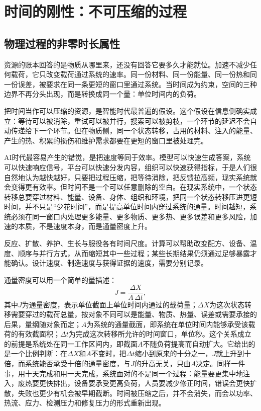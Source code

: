 \section{时间的刚性：不可压缩的过程}

\subsection{物理过程的非零时长属性}

资源的账本回答的是物质从哪里来，还没有回答它要多久才能就位。加速不减少任何载荷，它只改变载荷通过系统的速率。同一份材料、同一份能量、同一份热和同一份误差，被要求在同一条更短的窗口里通过系统。当时间成为约束，空间的三种边界不再分头出现，而是转换成同一个量：单位时间内的负荷。

把时间当作可以压缩的资源，是智能时代最普遍的假设。这个假设在信息侧确实成立：等待可以被消除，重试可以被并行，搜索可以被剪枝，一个环节的延迟不会自动传递给下一个环节。但在物质侧，同一个状态转移，占用的材料、注入的能量、产生的热、积累的损伤和维护需求都要在更短的窗口里被处理完。

AI时代最容易产生的错觉，是把速度等同于效率。模型可以快速生成答案，系统可以快速响应信号，平台可以快速分发内容，组织可以快速获得指标，于是人们很自然地认为越快越好，只要把过程压缩，把等待消除，把反馈拉高频，现实系统就会变得更有效率。但时间不是一个可以任意删除的空白。在现实系统中，一个状态转移总要穿过材料、能量、设备、身体、组织和环境，把同一个状态转移压进更短时间，并不只是“少花时间”，而是提高单位时间内穿过系统的通量。时间越短，系统必须在同一窗口内处理更多能量、更多物质、更多热、更多误差和更多风险，加速的本质，不是速度本身，而是通量密度上升。

反应、扩散、养护、生长与服役各有时间尺度。计算可以帮助改变配方、设备、温度、顺序与并行方式，从而缩短其中一些过程；某些长期结果仍须通过足够暴露才能确认。设计速度、制造速度与获得证据的速度，需要分别记录。


通量密度可以用一个简单的量描述：
\begin{equation}
J=\frac{\Delta X}{A\,\Delta t},
\label{eq:flux}
\end{equation}
其中$J$为通量密度，表示单位截面上单位时间内通过的载荷量；$\Delta X$为这次状态转移需要穿过的载荷总量，按对象不同可以是能量、物质、热量、误差或需要承接的后果，量纲随对象而定；$A$为系统的通量截面，即系统在单位时间内能够承受该载荷的有效截面积；$\Delta t$为完成这次转移所允许的时间窗口，单位秒。这个关系成立的前提是系统处在同一工作区间内，即截面$A$不随负荷提高而自动扩大。它给出的是一个比例判断：在$\Delta X$和$A$不变时，把$\Delta t$缩小到原来的十分之一，$J$就上升到十倍，而系统能否承受十倍的通量密度，与$J$的升高无关，只由$A$决定。同样一件事，用十天完成和用一天完成，系统面对的不是同一个过程：能量要更集中地注入，废热要更快排出，设备要承受更高负荷，人员要减少修正时间，错误会更快扩散，失败也更少有机会被早期截断。时间被压缩之后，并不会消失，而会以功率、热流、应力、检测压力和修复压力的形式重新出现。

